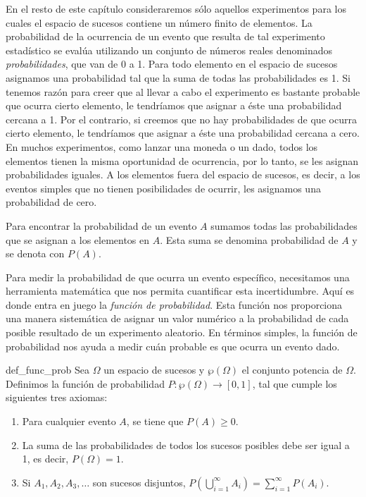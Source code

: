 En el resto de este capítulo consideraremos sólo aquellos experimentos para los cuales el espacio de sucesos contiene un número finito de elementos. La probabilidad de la ocurrencia de un evento que resulta de tal experimento estadístico se evalúa utilizando un conjunto de números reales denominados \emph{probabilidades}, que van de 0 a 1. Para todo elemento en el espacio de sucesos asignamos una probabilidad tal que la suma de todas las probabilidades es 1. Si tenemos razón para creer que al llevar a cabo el experimento es bastante probable que ocurra cierto elemento, le tendríamos que asignar a éste una probabilidad cercana a 1. Por el contrario, si creemos que no hay probabilidades de que ocurra cierto elemento, le tendríamos que asignar a éste una probabilidad cercana a cero. En muchos experimentos, como lanzar una moneda o un dado, todos los elementos tienen la misma oportunidad de ocurrencia, por lo tanto, se les asignan probabilidades iguales. A los elementos fuera del espacio de sucesos, es decir, a los eventos simples que no tienen posibilidades de ocurrir, les asignamos una probabilidad de cero.

\newpage

Para encontrar la probabilidad de un evento $A$ sumamos todas las probabilidades que se asignan a los elementos en $A$. Esta suma se denomina probabilidad de $A$
y se denota con $P(A)$.

Para medir la probabilidad de que ocurra un evento específico, necesitamos una herramienta matemática que nos permita cuantificar esta incertidumbre. Aquí es donde entra en juego la \emph{función de probabilidad}. Esta función nos proporciona una manera sistemática de asignar un valor numérico a la probabilidad de cada posible resultado de un experimento aleatorio. En términos simples, la función de probabilidad nos ayuda a medir cuán probable es que ocurra un evento dado.

\begin{definicion}{}{def_func_prob}
    Sea $\Omega$ un espacio de sucesos y $\wp(\Omega)$ el conjunto potencia de $\Omega$. Definimos la función de probabilidad $P: \wp(\Omega) \longrightarrow [0, 1]$, tal que cumple los siguientes tres axiomas:
    \begin{enumerate}[label=\roman*., topsep=6pt, itemsep=0pt]
        \item Para cualquier evento $A$, se tiene que $P(A) \geq 0$.
        \item La suma de las probabilidades de todos los sucesos posibles debe ser igual a 1, es decir, $P(\Omega) = 1$.
        \item Si $A_1, A_2, A_3, \dots$ son sucesos disjuntos, $\displaystyle P\left( \bigcup_{i = 1}^{\infty} A_i \right) = \sum_{i = 1}^{\infty} P(A_i)$.
    \end{enumerate}
\end{definicion}

